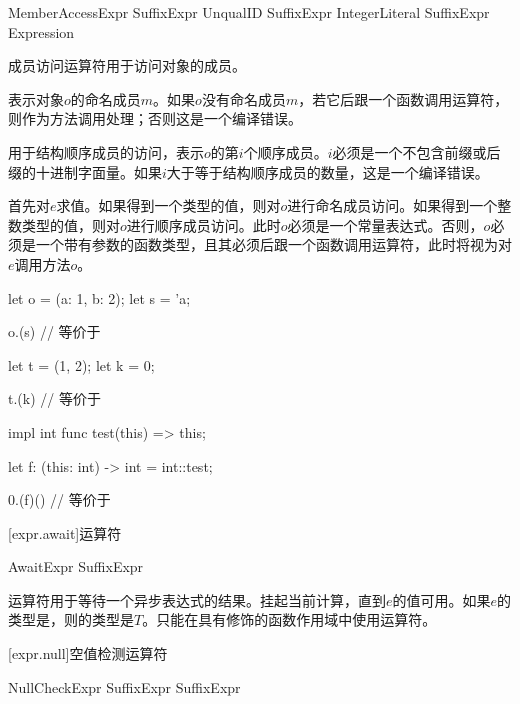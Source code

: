 \begin{bnf}{MemberAccessExpr}
    SuffixExpr  UnqualID \br
    SuffixExpr  IntegerLiteral \br
    SuffixExpr  \terminal{(} Expression \terminal{)}
\end{bnf}

\pnum
成员访问运算符用于访问对象的成员。

\pnum
{}表示对象$o$的命名成员$m$。如果$o$没有命名成员$m$，若它后跟一个函数调用运算符，则作为方法调用处理；否则这是一个编译错误。

\pnum
{}用于结构顺序成员的访问，表示$o$的第$i$个顺序成员。$i$必须是一个不包含前缀或后缀的十进制字面量。如果$i$大于等于结构顺序成员的数量，这是一个编译错误。

\pnum
{}首先对$e$求值。如果得到一个类型的值，则对$o$进行命名成员访问。如果得到一个整数类型的值，则对$o$进行顺序成员访问。此时$o$必须是一个常量表达式。否则，$o$必须是一个带有参数的函数类型，且其必须后跟一个函数调用运算符，此时将视为对$e$调用方法$o$。

\enterexample
\begin{codeblock}
let o = (a: 1, b: 2);
let s = 'a;

o.(s) // 等价于

let t = (1, 2);
let k = 0;

t.(k) // 等价于

impl int {
    func test(this) => this;
}

let f: (this: int) -> int = int::test;

0.(f)() // 等价于
\end{codeblock}
\exitexample

[expr.await]{运算符}

\begin{bnf}{AwaitExpr}
    SuffixExpr  
\end{bnf}

\pnum
{}运算符用于等待一个异步表达式的结果。挂起当前计算，直到$e$的值可用。如果$e$的类型是，则的类型是$T$。只能在具有修饰的函数作用域中使用运算符。

[expr.null]{空值检测运算符}

\begin{bnf}{NullCheckExpr}
    SuffixExpr  \br
    SuffixExpr \terminal{!}
\end{bnf}

